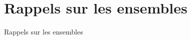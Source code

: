 \chapter{Rappels sur les ensembles}

\minitoc %

\justify

\setlength{\parindent}{0pt}


Rappels sur les ensembles